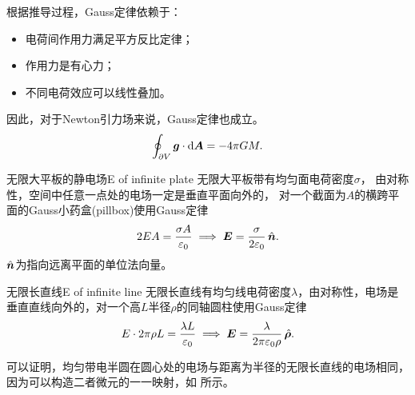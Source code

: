 \begin{corollary}
    根据推导过程，Gauss定律依赖于：
    \begin{itemize}
        \item 电荷间作用力满足平方反比定律；
        \item 作用力是有心力；
        \item 不同电荷效应可以线性叠加。
    \end{itemize}
    因此，对于Newton引力场来说，Gauss定律也成立。
    \begin{equation}
        \label{eq:ed-gauss-gravity}
        \oint_{\partial V}\bm g \cdot \mathop{}\!\mathrm{d}\bm A = -4\pi GM.
    \end{equation}
\end{corollary}


\begin{example}{无限大平板的静电场}{E of infinite plate}
    无限大平板带有均匀面电荷密度$\sigma$，%
    由对称性，空间中任意一点处的电场一定是垂直平面向外的，
    对一个截面为$A$的横跨平面的Gauss小药盒(pillbox)使用Gauss定律
    \begin{equation}
        \label{eq:ed-infinite-sheet-field}
        2EA = \frac{\sigma A}{\varepsilon_0} \implies \bm E = \frac\sigma{2\varepsilon_0}\mathop{}\!\hat{\bm{n}}.
    \end{equation}
    $\mathop{}\!\hat{\bm{n}}$为指向远离平面的单位法向量。
    \begin{notecaptionblock}
        \label{fig:infinite plate}
    \end{notecaptionblock}
\end{example}
\begin{example}{无限长直线}{E of infinite line}
    无限长直线有均匀线电荷密度$\lambda$，由对称性，电场是垂直直线向外的，对一个高$L$半径$\rho$的同轴圆柱使用Gauss定律
    \begin{equation}
        \label{eq:ed-infinite-line-field}
        E \cdot 2\pi\rho L = \frac{\lambda L}{\varepsilon_0} \implies \bm E = \frac{\lambda}{2\pi\varepsilon_0\rho}\mathop{}\!\hat{\bm{\rho}}.
    \end{equation}
    \begin{notecaptionblock}
        \label{fig:infinite line}
    \end{notecaptionblock}
    \tcblower
    可以证明，均匀带电半圆在圆心处的电场与距离为半径的无限长直线的电场相同，因为可以构造二者微元的一一映射，如 所示。
    \begin{notecaptionblock}
        \label{fig:semicircle <=> line}
    \end{notecaptionblock}
\end{example}

